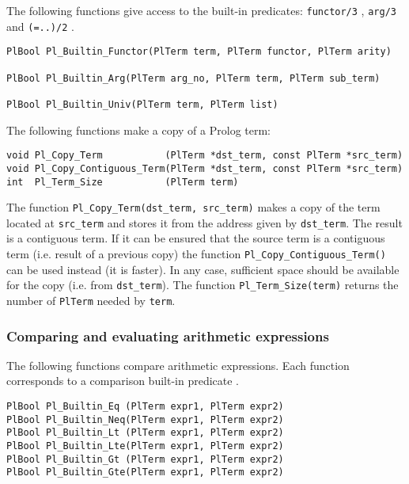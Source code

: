 The following functions give access to the built-in predicates:
\texttt{functor/3} , \texttt{arg/3} 
and \texttt{(=..)/2} .


\begin{Indentation}
\begin{verbatim}
PlBool Pl_Builtin_Functor(PlTerm term, PlTerm functor, PlTerm arity)

PlBool Pl_Builtin_Arg(PlTerm arg_no, PlTerm term, PlTerm sub_term)

PlBool Pl_Builtin_Univ(PlTerm term, PlTerm list)
\end{verbatim}
\end{Indentation}

The following functions make a copy of a Prolog term:

\begin{Indentation}
\begin{verbatim}
void Pl_Copy_Term           (PlTerm *dst_term, const PlTerm *src_term)
void Pl_Copy_Contiguous_Term(PlTerm *dst_term, const PlTerm *src_term)
int  Pl_Term_Size           (PlTerm term)
\end{verbatim}
\end{Indentation}

The function \texttt{Pl\_Copy\_Term(dst\_term, src\_term)} makes a copy of the
term located at \texttt{src\_term} and stores it from the address given by
\texttt{dst\_term}. The result is a contiguous term. If it can be ensured
that the source term is a contiguous term (i.e. result of a previous copy)
the function \texttt{Pl\_Copy\_Contiguous\_Term()} can be used instead (it is
faster). In any case, sufficient space should be available for the copy
(i.e. from \texttt{dst\_term}). The function \texttt{Pl\_Term\_Size(term)}
returns the number of \texttt{PlTerm} needed by \texttt{term}.

\subsubsection{Comparing and evaluating arithmetic expressions}
The following functions compare arithmetic expressions. Each function
corresponds to a comparison built-in predicate .

\begin{Indentation}
\begin{verbatim}
PlBool Pl_Builtin_Eq (PlTerm expr1, PlTerm expr2)
PlBool Pl_Builtin_Neq(PlTerm expr1, PlTerm expr2)
PlBool Pl_Builtin_Lt (PlTerm expr1, PlTerm expr2)
PlBool Pl_Builtin_Lte(PlTerm expr1, PlTerm expr2)
PlBool Pl_Builtin_Gt (PlTerm expr1, PlTerm expr2)
PlBool Pl_Builtin_Gte(PlTerm expr1, PlTerm expr2)
\end{verbatim}
\end{Indentation}

